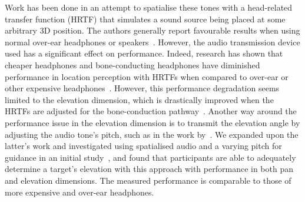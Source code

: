 \documentclass[acmsmall]{acmart}
\begin{document}
Work has been done in an attempt to spatialise these tones with a head-related transfer function (HRTF) that simulates a sound source being placed at some arbitrary 3D position.
The authors generally report favourable results when using normal over-ear headphones or speakers~\citep{geronazzo2016interactive,wilson2007swan,katz2010navig,blum2013spatialized,presti2019watchout,crispien1994guib}.
However, the audio transmission device used has a significant effect on performance.
Indeed, research has shown that cheaper headphones and bone-conducting headphones have diminished performance in location perception with HRTFs when compared to over-ear or other expensive headphones~\citep{stanley2006lateralization,voong2019auditory,mascetti2016sonification}.
However, this performance degradation seems limited to the elevation dimension, which is drastically improved when the HRTFs are adjusted for the bone-conduction pathway~\citep{stanley2006lateralization,pec2008individual}.
Another way around the performance issue in the elevation dimension is to transmit the elevation angle by adjusting the audio tone's pitch, such as in the work by~\citet{durette2008visuo}.
We expanded upon the latter's work and investigated using spatialised audio and a varying pitch for guidance in an initial study~\cite{lock2019bone}, and found that participants are able to adequately determine a target's elevation with this approach with performance in both pan and elevation dimensions.
The measured performance is comparable to those of more expensive and over-ear headphones.
\end{document}
